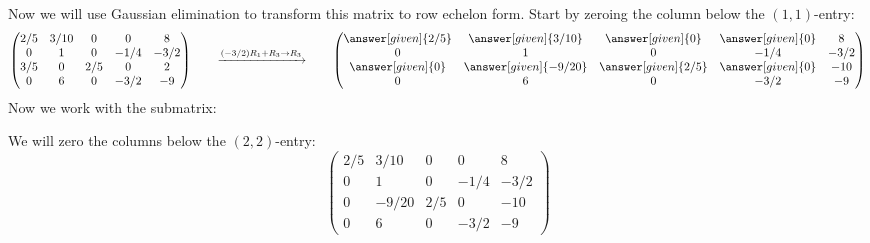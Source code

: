 \documentclass{ximera}
\begin{document}
\begin{example}
\begin{explanation}
Now we will use Gaussian elimination to transform this matrix to row echelon form. Start by zeroing the column below the $(1,1)$-entry:
\[
  \begin{pmatrix}
    {2/5}&  {3/10} & {0} &{0} &8 \\
    {0}&  {1} & {0} &{-1/4} & -3/2\\
    {3/5}&  {0} & {2/5} &{0} &2\\
    {0}&  {6} & {0} &{-3/2} &-9
  \end{pmatrix}
  \qquad\xrightarrow{(-3/2) R_1 + R_3\to R_3}\qquad
  \begin{pmatrix}
    \answer[given]{2/5}&  \answer[given]{3/10} & \answer[given]{0} &\answer[given]{0} &8 \\
    {0}&  {1} & {0} &{-1/4} & -3/2\\
    \answer[given]{0}&  \answer[given]{-9/20} & \answer[given]{2/5} &\answer[given]{0} &-10\\
    {0}&  {6} & {0} &{-3/2} &-9
  \end{pmatrix}
\]
Now we work with the submatrix:
\begin{center}
\end{center}
We will zero the columns below the $(2,2)$-entry:
\[
  \begin{pmatrix}
    {2/5}&  {3/10} & {0} &{0} &8 \\
    {0}&  {1} & {0} &{-1/4} & -3/2\\
    {0}&  {-9/20} & {2/5} &{0} &-10\\
    {0}&  {6} & {0} &{-3/2} &-9
  \end{pmatrix}
\]
\end{explanation}
\end{example}
\end{document}
